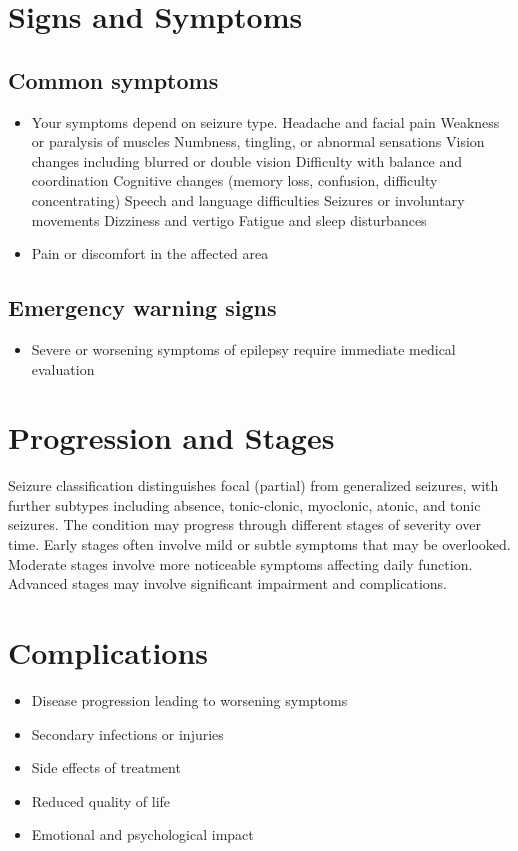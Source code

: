 \section{Signs and Symptoms}

\subsection{Common symptoms}
\begin{itemize}[noitemsep]
  \item Your symptoms depend on seizure type. Headache and facial pain Weakness or paralysis of muscles Numbness, tingling, or abnormal sensations Vision changes including blurred or double vision Difficulty with balance and coordination Cognitive changes (memory loss, confusion, difficulty concentrating) Speech and language difficulties Seizures or involuntary movements Dizziness and vertigo Fatigue and sleep disturbances
  \item Pain or discomfort in the affected area
  \end{itemize}

\subsection{Emergency warning signs}
\begin{itemize}[noitemsep]
  \item Severe or worsening symptoms of epilepsy require immediate medical evaluation
\end{itemize}
\section{Progression and Stages}
Seizure classification distinguishes focal (partial) from generalized seizures, with further subtypes including absence, tonic-clonic, myoclonic, atonic, and tonic seizures. The condition may progress through different stages of severity over time. Early stages often involve mild or subtle symptoms that may be overlooked. Moderate stages involve more noticeable symptoms affecting daily function. Advanced stages may involve significant impairment and complications.
\section{Complications}
\begin{itemize}[noitemsep]
  \item Disease progression leading to worsening symptoms
  \item Secondary infections or injuries
  \item Side effects of treatment
  \item Reduced quality of life
  \item Emotional and psychological impact
\end{itemize}
